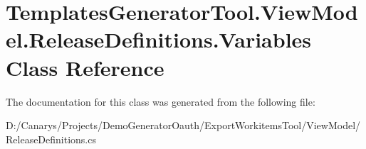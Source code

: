 \hypertarget{class_templates_generator_tool_1_1_view_model_1_1_release_definitions_1_1_variables}{}\section{Templates\+Generator\+Tool.\+View\+Model.\+Release\+Definitions.\+Variables Class Reference}
\label{class_templates_generator_tool_1_1_view_model_1_1_release_definitions_1_1_variables}


The documentation for this class was generated from the following file\+:\begin{DoxyCompactItemize}
\item 
D\+:/\+Canarys/\+Projects/\+Demo\+Generator\+Oauth/\+Export\+Workitems\+Tool/\+View\+Model/Release\+Definitions.\+cs\end{DoxyCompactItemize}
